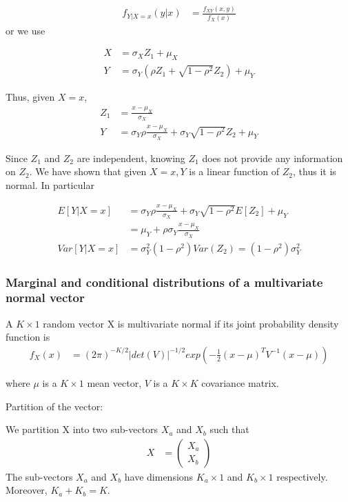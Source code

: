 \begin{align*}
	f_{Y|X=x} (y|x) &= \frac{f_{XY} (x, y)}{f_X(x)}
\end{align*}
or we use

\begin{align*}
	X &= \sigma_X Z_1 + \mu_X \\
	Y &= \sigma_Y \left(\rho Z_1 + \sqrt{1-\rho^2} Z_2 \right)  + \mu_Y
\end{align*}

Thus, given $X=x$, 
\begin{align*}
	Z_1 &= \frac{x - \mu_X}{\sigma_X} \\
	Y &= \sigma_Y \rho \frac{x- \mu_X}{\sigma_X} + \sigma_Y \sqrt{1- \rho^2} Z_2 + \mu_Y 
\end{align*}

Since $Z_1$ and $Z_2$ are independent, knowing $Z_1$ does not provide any information on $Z_2$. We have shown that given $X=x, Y$ is a linear function of $Z_2$, thus it is normal. In particular

\begin{align*}
	E[Y|X=x] &= \sigma_Y \rho \frac{x- \mu_X}{\sigma_X} + \sigma_Y \sqrt{1- \rho^2} E[Z_2] + \mu_Y  \\
	 &= \mu_Y + \rho \sigma_Y \frac{x-\mu_X}{\sigma_X} \\
	Var[Y|X=x] &= \sigma_Y^2 (1- \rho^2) Var(Z_2) = (1- \rho^2) \sigma_Y^2
\end{align*}

\subsubsection{Marginal and conditional distributions of a multivariate normal vector}

A $K \times 1$ random vector X is multivariate normal if its joint probability density function is 
\begin{align*}
	f_X(x) &= (2\pi)^{-K/2} |det(V)|^{-1/2} exp(-\frac{1}{2} (x-\mu)^T V^{-1}(x-\mu)) 
\end{align*}

where $\mu$ is a $K \times 1$ mean vector, $V$ is a $K \times K$ covariance matrix.

Partition of the vector:

 We partition X into two sub-vectors $X_a$ and $X_b$ such that
\begin{align*}
	X &= \begin{pmatrix}
		X_a \\
		X_b
	\end{pmatrix}
\end{align*}
The sub-vectors $X_a$ and $X_b$ have dimensions $K_a \times 1$ and $K_b \times 1$ respectively. Moreover, $K_a + K_b = K$.

